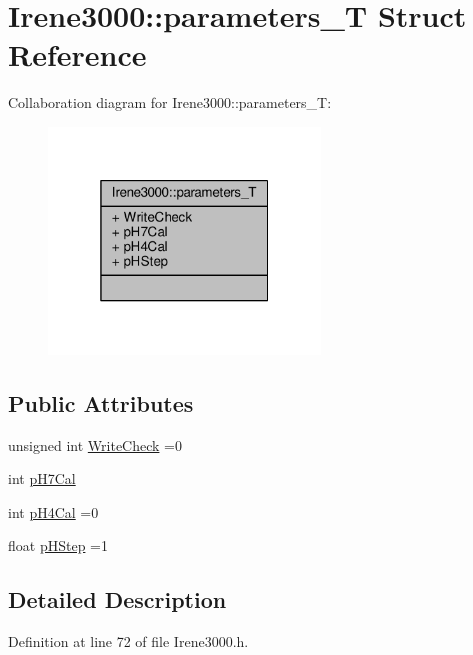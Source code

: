\hypertarget{structIrene3000_1_1parameters__T}{}\section{Irene3000\+:\+:parameters\+\_\+T Struct Reference}
\label{structIrene3000_1_1parameters__T}


Collaboration diagram for Irene3000\+:\+:parameters\+\_\+T\+:\nopagebreak
\begin{figure}[H]
\begin{center}
\leavevmode
\includegraphics[width=205pt]{structIrene3000_1_1parameters__T__coll__graph}
\end{center}
\end{figure}
\subsection*{Public Attributes}
\begin{DoxyCompactItemize}
\item 
unsigned int \hyperlink{structIrene3000_1_1parameters__T_a56f1f14d33a69300d580eda2dc52cecd}{Write\+Check} =0
\item 
int \hyperlink{structIrene3000_1_1parameters__T_a21265466a570d84bff914f26d2f7a03e}{p\+H7\+Cal}
\item 
int \hyperlink{structIrene3000_1_1parameters__T_a1144de6fb54eb3e1dd2a3d8c2afc97dc}{p\+H4\+Cal} =0
\item 
float \hyperlink{structIrene3000_1_1parameters__T_a61cfcc2539d5f630e9071f3753aba9fe}{p\+H\+Step} =1
\end{DoxyCompactItemize}


\subsection{Detailed Description}


Definition at line 72 of file Irene3000.\+h.



